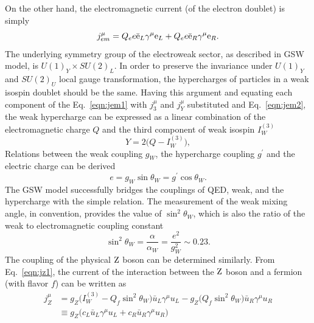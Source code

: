 On the other hand, the electromagnetic current (of the electron doublet) is simply 
\begin{equation}
\label{eqn:jem2}
j_{em}^{\mu}=Q_{e}e\bar{\mathrm{e}}_{L}\gamma^{\mu}\mathrm{e}_{L}+Q_{e}e\bar{\mathrm{e}}_{R}\gamma^{\mu}\mathrm{e}_{R}.
\end{equation}
The underlying symmetry group of the electroweak sector, as described in GSW model, is $U(1)_{Y} \times SU(2)_{L}$. In order to preserve the invariance under $U(1)_{Y}$ and $SU(2)_{U}$ local gauge transformation, the hypercharges of particles in a weak isospin doublet should be the same.
Having this argument and equating each component of the Eq.~\ref{eqn:jem1} with $j_{3}^{\mu}$ and $j_{Y}^{\mu}$ substituted and Eq.~\ref{eqn:jem2}, the weak hypercharge can be expressed as a linear combination of the electromagnetic charge $Q$ and the third component of weak isospin $I_{W}^{(3)}$
\begin{equation}
\label{eqn:YQI}
Y=2\big(Q-I_{W}^{(3)}\big),
\end{equation}
Relations between the weak coupling $g_{W}$, the hypercharge coupling $g^{\prime}$ and the electric charge can be derived
\begin{equation}
\label{eqn:relation3}
e=g_{W}\sin\theta_{W}=g^{\prime}\cos\theta_{W}.
\end{equation}
The GSW model successfully bridges the couplings of QED, weak, and the hypercharge with the simple relation.
The measurement of the weak mixing angle, in convention, provides the value of $\sin^{2}\theta_{W}$, which is also the ratio of the weak to electromagnetic coupling constant
\begin{equation}
\label{eqn:relation4}
\sin^{2}\theta_{W}=\frac{\alpha}{\alpha_{W}}=\frac{e^{2}}{g^{2}_{W}}\sim 0.23.
\end{equation}
The coupling of the physical $\mathrm{Z}$ boson can be determined similarly. 
From Eq.~\ref{eqn:jz1}, the current of the interaction between the $\mathrm{Z}$ boson and a fermion (with flavor $f$) can be written as 
\begin{equation}
\label{eqn:currentZff}
\begin{split}
j_{Z}^{\mu} & = g_{Z}\big(I_{W}^{(3)}-Q_{f}\sin^{2}\theta_{W}\big)\bar{u}_{L}\gamma^{\mu}u_{L}-g_{Z}\big(Q_{f}\sin^{2}\theta_{W}\big)\bar{u}_{R}\gamma^{\mu}u_{R}\\
& \equiv g_{Z}\big(c_{L}\bar{u}_{L}\gamma^{\mu}u_{L}+c_{R}\bar{u}_{R}\gamma^{\mu}u_{R}\big) \\
\end{split}
\end{equation}
